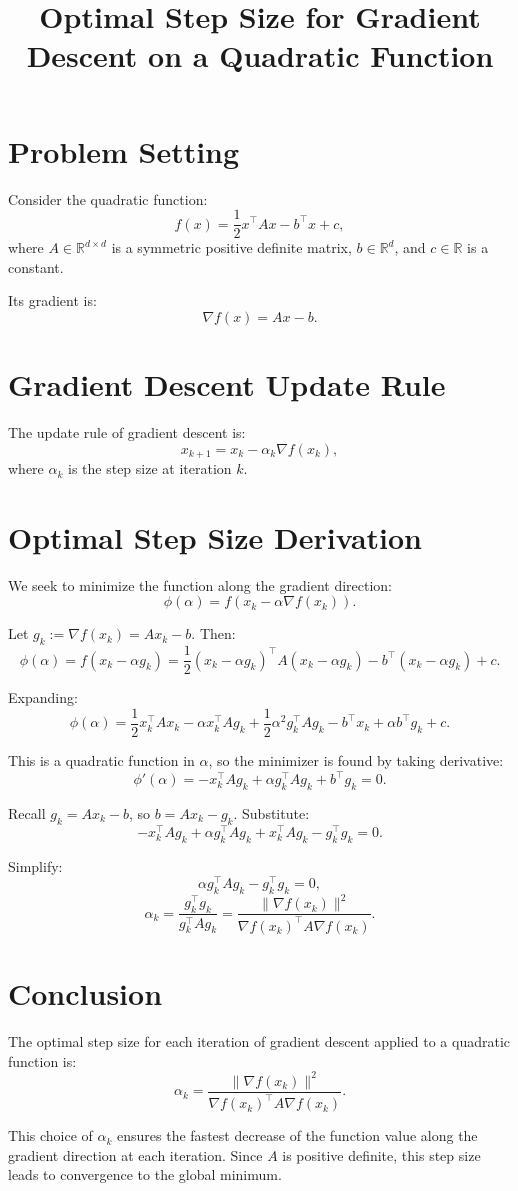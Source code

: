 \documentclass[12pt]{article}
\title{Optimal Step Size for Gradient Descent on a Quadratic Function}
\date{}
\begin{document}
\maketitle

\section*{Problem Setting}

Consider the quadratic function:
\[
f(x) = \frac{1}{2} x^\top A x - b^\top x + c,
\]
where \( A \in \mathbb{R}^{d \times d} \) is a symmetric positive definite matrix, \( b \in \mathbb{R}^d \), and \( c \in \mathbb{R} \) is a constant.

Its gradient is:
\[
\nabla f(x) = A x - b.
\]

\section*{Gradient Descent Update Rule}

The update rule of gradient descent is:
\[
x_{k+1} = x_k - \alpha_k \nabla f(x_k),
\]
where \( \alpha_k \) is the step size at iteration \( k \).

\section*{Optimal Step Size Derivation}

We seek to minimize the function along the gradient direction:
\[
\phi(\alpha) = f(x_k - \alpha \nabla f(x_k)).
\]

Let \( g_k := \nabla f(x_k) = A x_k - b \). Then:
\[
\phi(\alpha) = f(x_k - \alpha g_k) = \frac{1}{2} (x_k - \alpha g_k)^\top A (x_k - \alpha g_k) - b^\top (x_k - \alpha g_k) + c.
\]

Expanding:
\[
\phi(\alpha) = \frac{1}{2} x_k^\top A x_k - \alpha x_k^\top A g_k + \frac{1}{2} \alpha^2 g_k^\top A g_k - b^\top x_k + \alpha b^\top g_k + c.
\]

This is a quadratic function in \( \alpha \), so the minimizer is found by taking derivative:
\[
\phi'(\alpha) = - x_k^\top A g_k + \alpha g_k^\top A g_k + b^\top g_k = 0.
\]

Recall \( g_k = A x_k - b \), so \( b = A x_k - g_k \). Substitute:
\[
- x_k^\top A g_k + \alpha g_k^\top A g_k + x_k^\top A g_k - g_k^\top g_k = 0.
\]

Simplify:
\[
\alpha g_k^\top A g_k - g_k^\top g_k = 0,
\]
\[
\alpha_k = \frac{g_k^\top g_k}{g_k^\top A g_k} = \frac{\| \nabla f(x_k) \|^2}{\nabla f(x_k)^\top A \nabla f(x_k)}.
\]

\section*{Conclusion}

The optimal step size for each iteration of gradient descent applied to a quadratic function is:
\[
\boxed{ \alpha_k = \frac{ \| \nabla f(x_k) \|^2 }{ \nabla f(x_k)^\top A \nabla f(x_k) } }.
\]

This choice of \( \alpha_k \) ensures the fastest decrease of the function value along the gradient direction at each iteration. Since \( A \) is positive definite, this step size leads to convergence to the global minimum.
\end{document}
